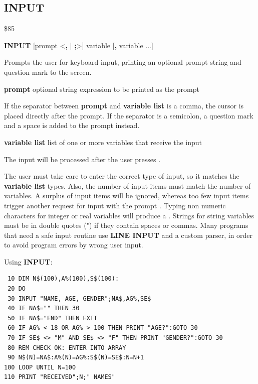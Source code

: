 \subsection{INPUT}
\begin{description}[leftmargin=2cm,style=nextline]
\item [Token:] \$85
\item [Format:] {\bf INPUT} [prompt <{\bf,} | {\bf;}>]
		variable [{\bf,} variable ...]
\item [Usage:] Prompts the user for keyboard input, printing an optional
               prompt string and question mark to the screen.

               {\bf prompt} optional string expression to be printed
               as the prompt

               If the separator between {\bf prompt} and {\bf variable list}
               is a comma, the cursor is placed directly after
               the prompt. If the separator is a semicolon,
               a question mark and a space is added to the prompt instead.

               {\bf variable list} list of one or more
               variables that receive the input

               The input will be processed after the user presses .

\item [Remarks:] The user must take care to enter the correct
               type of input, so it matches the {\bf variable list} types.
               Also, the number of input items must match the number
               of variables. A surplus of input items will be ignored,
               whereas too few input items trigger another request for input
               with the prompt .
               Typing non numeric characters for integer or real
               variables will produce a .
               Strings for string variables must be in double quotes (")
               if they contain spaces or commas.
               Many programs that need a safe input routine use
               {\bf LINE INPUT} and a custom parser, in order
               to avoid program errors by wrong user input.

\item [Example:] Using {\bf INPUT}:
\begin{tcolorbox}[colback=black,coltext=white]
\verbatimfont{\codefont}
\begin{verbatim}
 10 DIM N$(100),A%(100),S$(100):
 20 DO
 30 INPUT "NAME, AGE, GENDER";NA$,AG%,SE$
 40 IF NA$="" THEN 30
 50 IF NA$="END" THEN EXIT
 60 IF AG% < 18 OR AG% > 100 THEN PRINT "AGE?":GOTO 30
 70 IF SE$ <> "M" AND SE$ <> "F" THEN PRINT "GENDER?":GOTO 30
 80 REM CHECK OK: ENTER INTO ARRAY
 90 N$(N)=NA$:A%(N)=AG%:S$(N)=SE$:N=N+1
100 LOOP UNTIL N=100
110 PRINT "RECEIVED";N;" NAMES"
\end{verbatim}
\end{tcolorbox}
\end{description}

